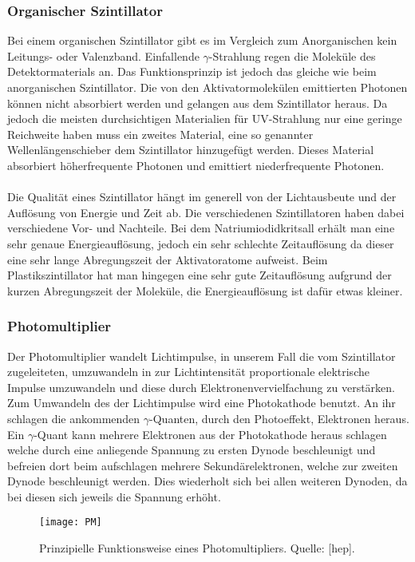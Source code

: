 \subsubsection{Organischer Szintillator}
Bei einem organischen Szintillator gibt es im Vergleich zum Anorganischen kein Leitungs- oder Valenzband. Einfallende $\gamma$-Strahlung regen die Moleküle des Detektormaterials an. Das Funktionsprinzip ist jedoch das gleiche wie beim anorganischen Szintillator. Die von den Aktivatormolekülen emittierten Photonen können nicht absorbiert werden und gelangen aus dem Szintillator heraus. Da jedoch die meisten durchsichtigen Materialien für UV-Strahlung nur eine geringe Reichweite haben muss ein zweites Material, eine so genannter Wellenlängenschieber dem Szintillator hinzugefügt werden. Dieses Material absorbiert höherfrequente Photonen und emittiert niederfrequente Photonen.\\~\\
Die Qualität eines Szintillator hängt im generell von der Lichtausbeute und der Auflösung von Energie und Zeit ab. Die verschiedenen Szintillatoren haben dabei verschiedene Vor- und Nachteile. Bei dem Natriumiodidkritsall erhält man eine sehr genaue Energieauflösung, jedoch ein sehr schlechte Zeitauflösung da dieser eine sehr lange Abregungszeit der Aktivatoratome aufweist. Beim Plastikszintillator hat man hingegen eine sehr gute Zeitauflösung aufgrund der kurzen Abregungszeit der Moleküle, die Energieauflösung ist dafür etwas kleiner.
\subsubsection{Photomultiplier}
Der Photomultiplier wandelt Lichtimpulse, in unserem Fall die vom Szintillator zugeleiteten, umzuwandeln in zur Lichtintensität proportionale elektrische Impulse umzuwandeln und diese durch Elektronenvervielfachung zu verstärken. Zum Umwandeln des der Lichtimpulse wird eine Photokathode benutzt. An ihr schlagen die ankommenden $\gamma$-Quanten, durch den Photoeffekt, Elektronen heraus. Ein $\gamma$-Quant kann mehrere Elektronen aus der Photokathode heraus schlagen welche durch eine anliegende Spannung zu ersten Dynode beschleunigt und befreien dort beim aufschlagen mehrere Sekundärelektronen, welche zur zweiten Dynode beschleunigt werden. Dies wiederholt sich bei allen weiteren Dynoden, da bei diesen sich jeweils die Spannung erhöht.

\begin{figure}[h]
\begin{center}
\texttt{[image: PM]}
\caption{Prinzipielle Funktionsweise eines Photomultipliers. Quelle: [hep].}
\label{fig:PM}
\end{center}
\end{figure}
